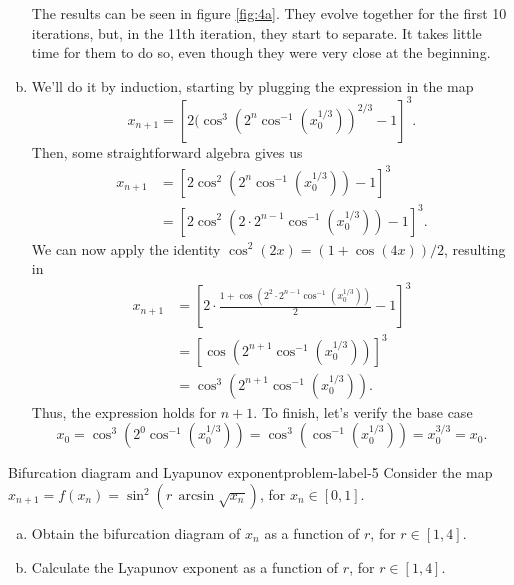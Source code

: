 \begin{enumerate}[(a)]
    The results can be seen in figure \ref{fig:4a}. They evolve together
    for the first 10 iterations, but, in the 11th iteration, they start to separate. 
    It takes little time for them to do so, even though they were very close
    at the beginning. 


    \item We'll do it by induction, starting by plugging the expression in the map
    \[
        x_{n+1} = [2(\cos^3 (2^n \cos^{-1} (x_0^{1/3}))^{2/3} - 1]^3.
    \]
    Then, some straightforward algebra gives us
    \[
    \begin{aligned}
        x_{n+1} &= [2\cos^2 (2^n \cos^{-1} (x_0^{1/3})) - 1]^3\\
        &= [2\cos^2 (2\cdot 2^{n-1} \cos^{-1} (x_0^{1/3})) - 1]^3.
    \end{aligned}
    \]
    We can now apply the identity $\cos^2(2x)=(1+\cos(4x))/2$,
    resulting in
    \[
    \begin{aligned}
        x_{n+1} &= \left[2\cdot\frac{1 + \cos(2^2\cdot 2^{n-1} \cos^{-1} (x_0^{1/3}))}{2}-1\right]^3\\
        &= \left[\cos(2^{n+1} \cos^{-1} (x_0^{1/3}))\right]^3\\
        &= \cos^3 (2^{n+1} \cos^{-1} (x_0^{1/3})).
    \end{aligned}
    \]
    Thus, the expression holds for $n+1$. To finish, let's verify the base case
    \[
        x_0 = \cos^3 (2^0 \cos^{-1} (x_0^{1/3})) = \cos^3 (\cos^{-1} (x_0^{1/3})) = x_0^{3/3} = x_0.
    \]


\end{enumerate}

\begin{problem}{Bifurcation diagram and Lyapunov exponent}{problem-label-5}
    Consider the map $x_{n+1} = f(x_n) = \sin^2(r\,\arcsin{\sqrt{x_n}})$, for $x_n \in [0, 1]$.

    \begin{enumerate}[(a)]
        \item Obtain the bifurcation diagram of $x_n$ as a function of $r$,
        for $r \in [1, 4]$.
        \item Calculate the Lyapunov exponent as a function of $r$, for $r \in [1, 4]$.
    \end{enumerate}

\end{problem}

